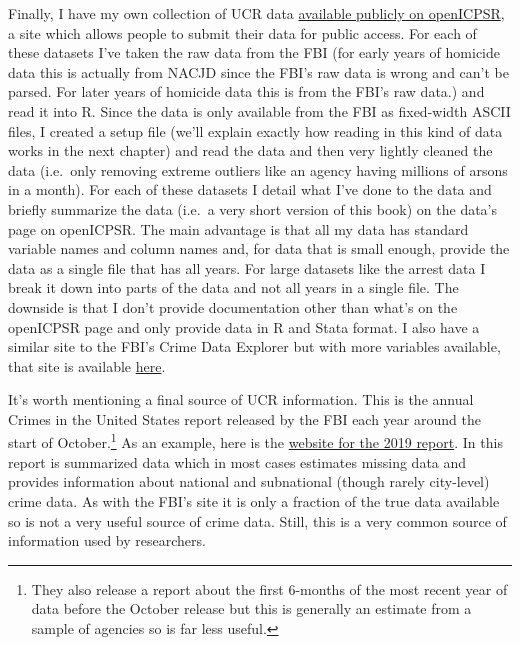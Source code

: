 \documentclass[
  12pt,
  openany]{book}
\begin{document}
Finally, I have my own collection of UCR data \href{https://www.openicpsr.org/openicpsr/search/studies?start=0\&ARCHIVE=openicpsr\&sort=score\%20desc\%2CDATEUPDATED\%20desc\&rows=25\&q=jacob\%20kaplan\%27s\%20concatenated\%20files}{available publicly on openICPSR}, a site which allows people to submit their data for public access. For each of these datasets I've taken the raw data from the FBI (for early years of homicide data this is actually from NACJD since the FBI's raw data is wrong and can't be parsed. For later years of homicide data this is from the FBI's raw data.) and read it into R. Since the data is only available from the FBI as fixed-width ASCII files, I created a setup file (we'll explain exactly how reading in this kind of data works in the next chapter) and read the data and then very lightly cleaned the data (i.e.~only removing extreme outliers like an agency having millions of arsons in a month). For each of these datasets I detail what I've done to the data and briefly summarize the data (i.e.~a very short version of this book) on the data's page on openICPSR. The main advantage is that all my data has standard variable names and column names and, for data that is small enough, provide the data as a single file that has all years. For large datasets like the arrest data I break it down into parts of the data and not all years in a single file. The downside is that I don't provide documentation other than what's on the openICPSR page and only provide data in R and Stata format. I also have a similar site to the FBI's Crime Data Explorer but with more variables available, that site is available \href{jacobdkaplan.com/}{here}.

It's worth mentioning a final source of UCR information. This is the annual Crimes in the United States report released by the FBI each year around the start of October.\footnote{They also release a report about the first 6-months of the most recent year of data before the October release but this is generally an estimate from a sample of agencies so is far less useful.} As an example, here is the \href{https://ucr.fbi.gov/crime-in-the-u.s/2019/crime-in-the-u.s.-2019}{website for the 2019 report}. In this report is summarized data which in most cases estimates missing data and provides information about national and subnational (though rarely city-level) crime data. As with the FBI's site it is only a fraction of the true data available so is not a very useful source of crime data. Still, this is a very common source of information used by researchers.
\end{document}
